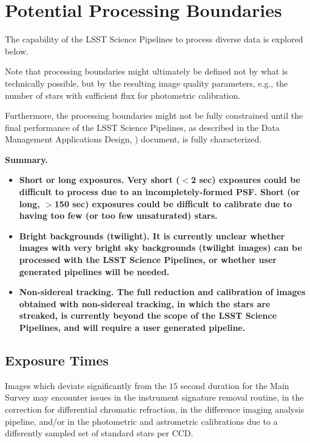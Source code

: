 \section{Potential Processing Boundaries}\label{sec:procbounds}

The capability of the LSST Science Pipelines to process diverse data is explored below.

Note that processing boundaries might ultimately be defined not by what is technically 
possible, but by the resulting image quality parameters, e.g., the number of stars with 
sufficient flux for photometric calibration.

Furthermore, the processing boundaries might not be fully constrained until the final 
performance of the LSST Science Pipelines, as described in the Data Management 
Applications Design, ) document, is fully characterized.

{\bf Summary.}\\

\begin{itemize}
\item \bf{Short or long exposures.} Very short ($<$2 sec) exposures could be difficult to 
process due to an incompletely-formed PSF. Short (or long, $>$150 sec) exposures 
could be difficult to calibrate due to having too few (or too few unsaturated) stars.
\item \bf{Bright backgrounds (twilight).} It is currently unclear whether images with very 
bright sky backgrounds (twilight images) can be processed with the LSST Science Pipelines, 
or whether user generated pipelines will be needed.
\item \bf{Non-sidereal tracking.} The full reduction and calibration of images obtained 
with non-sidereal tracking, in which the stars are streaked, is currently beyond the scope 
of the LSST Science Pipelines, and will require a user generated pipeline.
\end{itemize}


\subsection{Exposure Times}\label{ssec:procbounds_expt}

Images which deviate significantly from the $15$ second duration for the Main Survey 
may encounter issues in the instrument signature removal routine, in the correction for 
differential chromatic refraction, in the difference imaging analysis pipeline, and/or in 
the photometric and astrometric calibrations due to a differently sampled set of standard 
stars per CCD.

